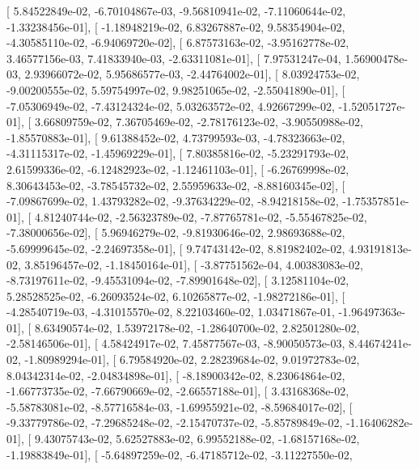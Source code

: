 \documentclass{article}
\begin{document}
       [  5.84522849e-02,  -6.70104867e-03,  -9.56810941e-02,
         -7.11060644e-02,  -1.33238456e-01],
       [ -1.18948219e-02,   6.83267887e-02,   9.58354904e-02,
         -4.30585110e-02,  -6.94069720e-02],
       [  6.87573163e-02,  -3.95162778e-02,   3.46577156e-03,
          7.41833940e-03,  -2.63311081e-01],
       [  7.97531247e-04,   1.56900478e-03,   2.93966072e-02,
          5.95686577e-03,  -2.44764002e-01],
       [  8.03924753e-02,  -9.00200555e-02,   5.59754997e-02,
          9.98251065e-02,  -2.55041890e-01],
       [ -7.05306949e-02,  -7.43124324e-02,   5.03263572e-02,
          4.92667299e-02,  -1.52051727e-01],
       [  3.66809759e-02,   7.36705469e-02,  -2.78176123e-02,
         -3.90550988e-02,  -1.85570883e-01],
       [  9.61388452e-02,   4.73799593e-03,  -4.78323663e-02,
         -4.31115317e-02,  -1.45969229e-01],
       [  7.80385816e-02,  -5.23291793e-02,   2.61599336e-02,
         -6.12482923e-02,  -1.12461103e-01],
       [ -6.26769998e-02,   8.30643453e-02,  -3.78545732e-02,
          2.55959633e-02,  -8.88160345e-02],
       [ -7.09867699e-02,   1.43793282e-02,  -9.37634229e-02,
         -8.94218158e-02,  -1.75357851e-01],
       [  4.81240744e-02,  -2.56323789e-02,  -7.87765781e-02,
         -5.55467825e-02,  -7.38000656e-02],
       [  5.96946279e-02,  -9.81930646e-02,   2.98693688e-02,
         -5.69999645e-02,  -2.24697358e-01],
       [  9.74743142e-02,   8.81982402e-02,   4.93191813e-02,
          3.85196457e-02,  -1.18450164e-01],
       [ -3.87751562e-04,   4.00383083e-02,  -8.73197611e-02,
         -9.45531094e-02,  -7.89901648e-02],
       [  3.12581104e-02,   5.28528525e-02,  -6.26093524e-02,
          6.10265877e-02,  -1.98272186e-01],
       [ -4.28540719e-03,  -4.31015570e-02,   8.22103460e-02,
          1.03471867e-01,  -1.96497363e-01],
       [  8.63490574e-02,   1.53972178e-02,  -1.28640700e-02,
          2.82501280e-02,  -2.58146506e-01],
       [  4.58424917e-02,   7.45877567e-03,  -8.90050573e-03,
          8.44674241e-02,  -1.80989294e-01],
       [  6.79584920e-02,   2.28239684e-02,   9.01972783e-02,
          8.04342314e-02,  -2.04834898e-01],
       [ -8.18900342e-02,   8.23064864e-02,  -1.66773735e-02,
         -7.66790669e-02,  -2.66557188e-01],
       [  3.43168368e-02,  -5.58783081e-02,  -8.57716584e-03,
         -1.69955921e-02,  -8.59684017e-02],
       [ -9.33779786e-02,  -7.29685248e-02,  -2.15470737e-02,
         -5.85789849e-02,  -1.16406282e-01],
       [  9.43075743e-02,   5.62527883e-02,   6.99552188e-02,
         -1.68157168e-02,  -1.19883849e-01],
       [ -5.64897259e-02,  -6.47185712e-02,  -3.11227550e-02,
\end{document}

